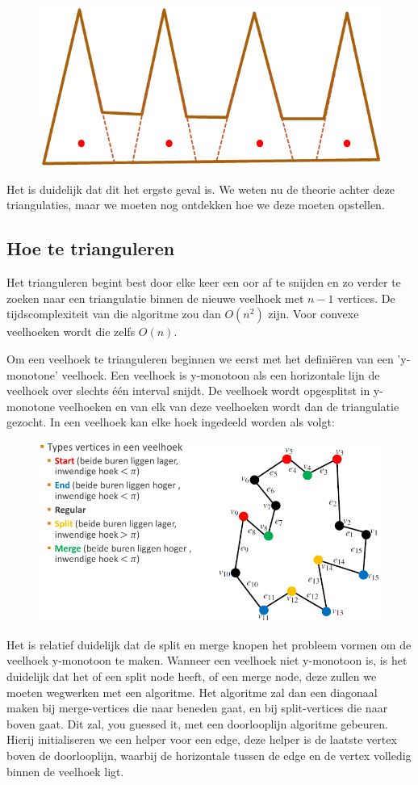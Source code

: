 \documentclass[12pt,a4paper]{article}
\begin{document}
	\begin{figure}[H]
		\centering
		\includegraphics[width=0.6\linewidth]{afbeeldingen/triangulatie-kam}
		\label{fig:triangulatie-kam}
	\end{figure}

	Het is duidelijk dat dit het ergste geval is. We weten nu de theorie achter deze triangulaties, maar we moeten nog ontdekken hoe we deze moeten opstellen. 
	
	
	\subsection{Hoe te trianguleren}
	Het trianguleren begint best door elke keer een oor af te snijden en zo verder te zoeken naar een triangulatie binnen de nieuwe veelhoek met $n-1$ vertices. De tijdscomplexiteit van die algoritme zou dan $O(n^2)$ zijn. Voor convexe veelhoeken wordt die zelfs $O(n)$. 
	
	Om een veelhoek te trianguleren beginnen we eerst met het definiëren van een 'y-monotone' veelhoek. Een veelhoek is y-monotoon als een horizontale lijn de veelhoek over slechts één interval snijdt. De veelhoek wordt opgesplitst in y-monotone veelhoeken en van elk van deze veelhoeken wordt dan de triangulatie gezocht. In een veelhoek kan elke hoek ingedeeld worden als volgt: 
	\begin{figure}[H]
		\centering
		\includegraphics[width=0.7\linewidth]{afbeeldingen/triangulaties-y-monotoon}
		\label{fig:triangulaties-y-monotoon}
	\end{figure}
	Het is relatief duidelijk dat de split en merge knopen het probleem vormen om de veelhoek y-monotoon te maken. Wanneer een veelhoek niet y-monotoon is, is het duidelijk dat het of een split node heeft, of een merge node, deze zullen we moeten wegwerken met een algoritme. Het algoritme zal dan een diagonaal maken bij merge-vertices die naar beneden gaat, en bij split-vertices die naar boven gaat. Dit zal, you guessed it, met een doorlooplijn algoritme gebeuren. Hierij initialiseren we een helper voor een edge, deze helper is de laatste vertex boven de doorlooplijn, waarbij de horizontale tussen de edge en de vertex volledig binnen de veelhoek ligt. 
	
\end{document}
